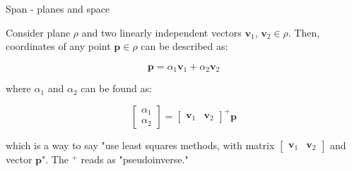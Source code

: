 \documentclass{beamer}
\begin{document}
\begin{frame}{Span - planes and space}
	\begin{flushleft}
		
		Consider plane $\rho$ and two linearly independent vectors $\mathbf v_1$, $\mathbf v_2 \in \rho$. Then, coordinates of any point $\mathbf p \in \rho$ can be described as:
		
		\begin{equation}
			\mathbf p = \alpha_1 \mathbf v_1 + \alpha_2 \mathbf v_2
		\end{equation}
	
	where $\alpha_1$ and $\alpha_2$ can be found as:
	
	\begin{equation}
		\begin{bmatrix}
			\alpha_1 \\ \alpha_2
		\end{bmatrix}
		=
		\begin{bmatrix}
			 \mathbf v_1 &  \mathbf v_2
		\end{bmatrix}^+
	    \mathbf p
	\end{equation}
	
	which is a way to say "use least squares methods, with matrix $	\begin{bmatrix}
		\mathbf v_1 &  \mathbf v_2
	\end{bmatrix}$ and vector $\mathbf p$". The $^+$ reads as "pseudoinverse."
		
	\end{flushleft}
\end{frame}
\end{document}
